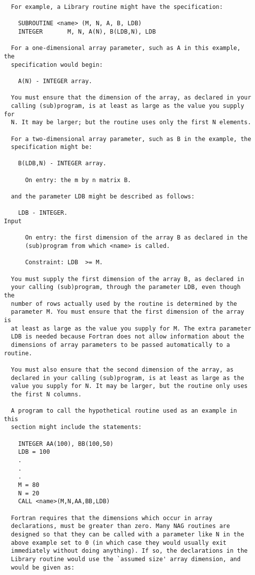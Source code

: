 \begin{verbatim}
  For example, a Library routine might have the specification:
 
    SUBROUTINE <name> (M, N, A, B, LDB)
    INTEGER       M, N, A(N), B(LDB,N), LDB
 
  For a one-dimensional array parameter, such as A in this example, the
  specification would begin:
 
    A(N) - INTEGER array.
 
  You must ensure that the dimension of the array, as declared in your
  calling (sub)program, is at least as large as the value you supply for
  N. It may be larger; but the routine uses only the first N elements.
 
  For a two-dimensional array parameter, such as B in the example, the
  specification might be:
 
    B(LDB,N) - INTEGER array.
 
      On entry: the m by n matrix B.
 
  and the parameter LDB might be described as follows:
 
    LDB - INTEGER.                                                 Input
 
      On entry: the first dimension of the array B as declared in the
      (sub)program from which <name> is called.
 
      Constraint: LDB  >= M.
 
  You must supply the first dimension of the array B, as declared in
  your calling (sub)program, through the parameter LDB, even though the
  number of rows actually used by the routine is determined by the
  parameter M. You must ensure that the first dimension of the array is
  at least as large as the value you supply for M. The extra parameter
  LDB is needed because Fortran does not allow information about the
  dimensions of array parameters to be passed automatically to a routine.
 
  You must also ensure that the second dimension of the array, as
  declared in your calling (sub)program, is at least as large as the
  value you supply for N. It may be larger, but the routine only uses
  the first N columns.
 
  A program to call the hypothetical routine used as an example in this
  section might include the statements:
 
    INTEGER AA(100), BB(100,50)
    LDB = 100
    .
    .
    .
    M = 80
    N = 20
    CALL <name>(M,N,AA,BB,LDB)
 
  Fortran requires that the dimensions which occur in array
  declarations, must be greater than zero. Many NAG routines are
  designed so that they can be called with a parameter like N in the
  above example set to 0 (in which case they would usually exit
  immediately without doing anything). If so, the declarations in the
  Library routine would use the `assumed size' array dimension, and
  would be given as:
 

\end{verbatim}

